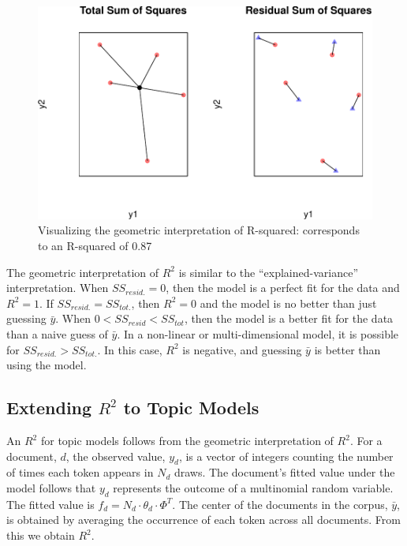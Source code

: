 \documentclass[conference,final,]{IEEEtran}
\makeatletter
\def\maxwidth{\ifdim\Gin@nat@width>\linewidth\linewidth
\else\Gin@nat@width\fi}
\let\Oldincludegraphics\includegraphics
\renewcommand{\includegraphics}[1]{\Oldincludegraphics[width=\maxwidth]{#1}}
\makeatother
\begin{document}
\begin{figure}
\centering
\includegraphics{rsquared_topicmodels_files/figure-latex/geometric_graphic-1.pdf}
\caption{Visualizing the geometric interpretation of R-squared:
corresponds to an R-squared of 0.87}
\end{figure}

The geometric interpretation of \(R^2\) is similar to the
``explained-variance'' interpretation. When \(SS_{resid.} = 0\), then
the model is a perfect fit for the data and \(R^2 = 1\). If
\(SS_{resid.} = SS_{tot.}\), then \(R^2 = 0\) and the model is no better
than just guessing \(\bar{y}\). When \(0 < SS_{resid} < SS_{tot}\), then
the model is a better fit for the data than a naive guess of
\(\bar{y}\). In a non-linear or multi-dimensional model, it is possible
for \(SS_{resid.} > SS_{tot.}\). In this case, \(R^2\) is negative, and
guessing \(\bar{y}\) is better than using the model.

\hypertarget{extending-r2-to-topic-models}{%
\subsection{\texorpdfstring{Extending \(R^2\) to Topic
Models}{Extending R\^{}2 to Topic Models}}\label{extending-r2-to-topic-models}}

An \(R^2\) for topic models follows from the geometric interpretation of
\(R^2\). For a document, \(d\), the observed value, \(y_d\), is a vector
of integers counting the number of times each token appears in \(N_d\)
draws. The document's fitted value under the model follows that \(y_d\)
represents the outcome of a multinomial random variable. The fitted
value is \(f_d = N_d \cdot \theta_d \cdot \Phi^T\). The center of the
documents in the corpus, \(\bar{y}\), is obtained by averaging the
occurrence of each token across all documents. From this we obtain
\(R^2\).
\end{document}
